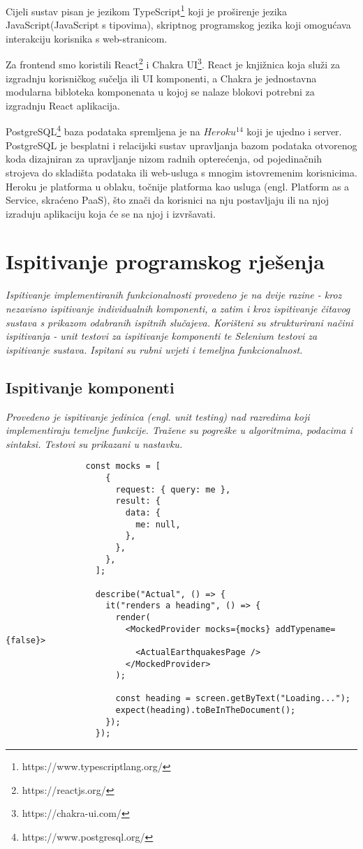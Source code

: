 		Cijeli sustav pisan je jezikom TypeScript\footnote{https://www.typescriptlang.org/} koji je proširenje jezika JavaScript(JavaScript s tipovima), skriptnog programskog jezika koji omogućava interakciju korisnika s web-stranicom.
		
		Za frontend smo koristili React\footnote{https://reactjs.org/} i Chakra UI\footnote{https://chakra-ui.com/}. React je knjižnica koja služi za izgradnju korisničkog sučelja ili UI komponenti, a Chakra je jednostavna modularna bibloteka komponenata	u kojoj se nalaze blokovi potrebni za izgradnju React aplikacija.
		
		 PostgreSQL\footnote{https://www.postgresql.org/} baza podataka spremljena je na $Heroku^{14}$	koji je ujedno i server. PostgreSQL je besplatni i relacijski sustav upravljanja bazom podataka otvorenog koda dizajniran za upravljanje nizom radnih opterećenja, od pojedinačnih strojeva do skladišta podataka ili web-usluga s mnogim istovremenim korisnicima. Heroku je platforma u oblaku, točnije platforma kao usluga (engl. Platform as a Service, skraćeno PaaS), što znači da korisnici	na nju postavljaju ili na njoj izraduju aplikaciju koja će se na njoj i izvršavati.
		
			\eject 
		
	
		\section{Ispitivanje programskog rješenja}
			
			 \textit{Ispitivanje implementiranih funkcionalnosti provedeno je na dvije razine - kroz nezavisno ispitivanje individualnih komponenti, a zatim i kroz ispitivanje čitavog sustava s prikazom odabranih ispitnih slučajeva. Korišteni su strukturirani načini ispitivanja - unit testovi za ispitivanje komponenti te Selenium testovi za ispitivanje sustava. Ispitani su rubni uvjeti i temeljna funkcionalnost.}
			
			\subsection{Ispitivanje komponenti}
			\textit{Provedeno je ispitivanje jedinica (engl. unit testing) nad razredima koji implementiraju temeljne funkcije. Tražene su pogreške u algoritmima, podacima i sintaksi. Testovi su prikazani u nastavku.}
			
			\noindent {}
			\begin{lstlisting}
				const mocks = [
					{
					  request: { query: me },
					  result: {
						data: {
						  me: null,
						},
					  },
					},
				  ];
				  
				  describe("Actual", () => {
					it("renders a heading", () => {
					  render(
						<MockedProvider mocks={mocks} addTypename={false}>
						  <ActualEarthquakesPage />
						</MockedProvider>
					  );
				  
					  const heading = screen.getByText("Loading...");
					  expect(heading).toBeInTheDocument();
					});
				  });
			\end{lstlisting}

